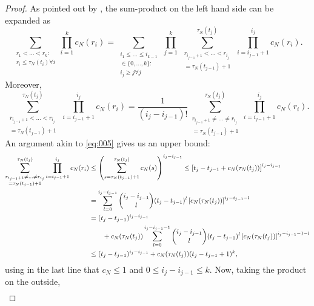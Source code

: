 \documentclass{article}
\newcommand{\1}[1]{\mathbbm{1}_{#1}}
\begin{document}
\begin{proof}
As pointed out by \citet[p.~460]{mohle1999}, the sum-product on the left hand side can be expanded as
\begin{equation}
\sum_{\substack{r_1<\dots<r_k :\\ r_i\leq \tau_N(t_i) \forall i}} 
        \prod_{i=1}^k c_N(r_i)
= \sum_{\substack{i_1\leq \dots\leq i_{k-1}\\ \in \{0,\dots,k\} :\\ 
        i_j \geq j \forall j}} \, \prod_{j=1}^k \,
        \sum_{\substack{ r_{i_{j-1}+1} < \dots < r_{i_j} \\ = \tau_N(t_{j-1})+1}}        
        ^{\tau_N(t_j)}  \,\prod_{i=i_{j-1}+1}^{i_j} c_N(r_i) .
\end{equation}
Moreover,
\begin{equation}
\sum_{\substack{ r_{i_{j-1}+1} < \dots < r_{i_j} \\ = \tau_N(t_{j-1})+1}}        
        ^{\tau_N(t_j)}  \,\prod_{i=i_{j-1}+1}^{i_j} c_N(r_i)
= \frac{1}{(i_j - i_{j-1})!} \sum_{\substack{ r_{i_{j-1}+1} \neq \dots 
        \neq r_{i_j} \\ = \tau_N(t_{j-1})+1 }}^{\tau_N(t_j)}
        \prod_{i=i_{j-1}+1}^{i_j} c_N(r_i) .
\end{equation}
An argument akin to \eqref{eq:005}
gives us an upper bound:
\begin{align}
\sum_{\substack{ r_{i_{j-1}+1} \neq \dots \neq r_{i_j} \\ = 
        \tau_N(t_{j-1})+1 }}^{\tau_N(t_j)}
        \prod_{i=i_{j-1}+1}^{i_j} c_N(r_i)
&\leq \left( \sum_{s=\tau_N(t_{j-1})+1}^{\tau_N(t_j)} c_N(s) \right)
        ^{i_j - i_{j-1}}
\leq \left[ t_j - t_{j-1} + c_N(\tau_N(t_j)) \right]^{i_j - i_{j-1}} \notag\\
&= \sum_{l=0}^{i_j - i_{j-1}} \binom{i_j - i_{j-1}}{l} (t_j - t_{j-1})^l 
        \left[ c_N(\tau_N(t_j)) \right]^{i_j - i_{j-1}-l} \notag\\
&= (t_j - t_{j-1})^{i_j - i_{j-1}} \notag\\
    &\qquad+ c_N(\tau_N(t_j)) \sum_{l=0}^{i_j - i_{j-1} -1} 
        \binom{i_j - i_{j-1}}{l} (t_j - t_{j-1})^l \left[ c_N(\tau_N(t_j)) \right]
        ^{i_j - i_{j-1}-1-l} \notag\\
&\leq (t_j - t_{j-1})^{i_j - i_{j-1}} 
        + c_N(\tau_N(t_j)) ( t_j - t_{j-1} +1 )^k ,
\end{align}
using in the last line that $c_N \leq 1$ and $0 \leq i_j - i_{j-1} \leq k$.
Now, taking the product on the outside,
\begin{align}

\end{align}
\end{proof}
\end{document}
